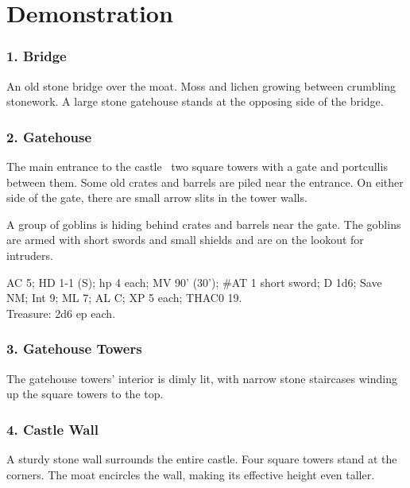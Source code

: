 \documentclass[english,12pt,openany,letterpaper]{book}
\begin{document}


\twocolumn

\clearFg

\chapter{Demonstration}

\subsection{1. Bridge}

An old stone bridge over the moat. Moss and lichen growing between crumbling stonework. A large stone gatehouse stands at the opposing side of the bridge.

\subsection{2. Gatehouse}

The main entrance to the castle \dash\ two square towers with a gate and portcullis between them. Some old crates and barrels are piled near the entrance. On either side of the gate, there are small arrow slits in the tower walls.

\tab A group of goblins is hiding behind crates and barrels near the gate. The goblins are armed with short swords and small shields and are on the lookout for intruders.


AC 5; HD 1-1 (S); hp 4 each; MV 90' (30'); \#AT 1 short sword; D 1d6; Save NM; Int 9; ML 7; AL C; XP 5 each; THAC0 19.
\\Treasure: 2d6 ep each.

\subsection{3. Gatehouse Towers}

The gatehouse towers' interior is dimly lit, with narrow stone staircases winding up the square towers to the top.

\subsection{4. Castle Wall}

A sturdy stone wall surrounds the entire castle. Four square towers stand at the corners. The moat encircles the wall, making its effective height even taller.
\end{document}
